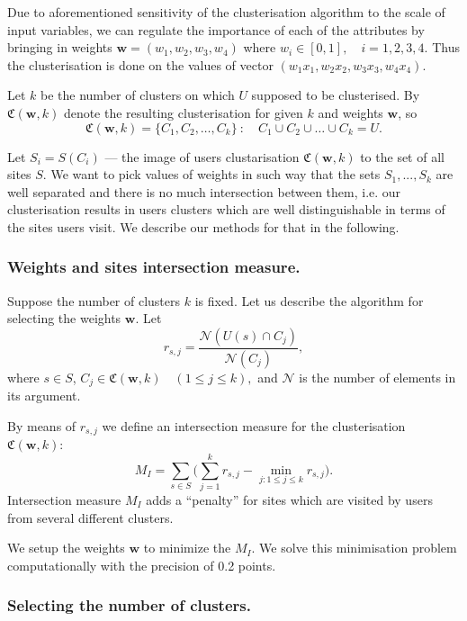 \documentclass[runningheads,a4paper]{llncs}
\begin{document}
Due to aforementioned sensitivity of the clusterisation algorithm to the scale of input variables, we can regulate the importance of each of the attributes by bringing in weights $\boldsymbol{w} = (w_1, w_2, w_3, w_4)$ where \quad $w_i \in [0, 1], \quad i = 1,2,3,4$. Thus the clusterisation is done on the values of vector $(w_1 x_1, w_2 x_2, w_3 x_3, w_4 x_4)$.

Let $k$ be the number of clusters on which $U$ supposed to be clusterised. By $\mathfrak{C}(\boldsymbol{w}, k)$ denote the resulting clusterisation for given $k$ and weights $\boldsymbol{w}$, so
\[
	\mathfrak{C}(\boldsymbol{w}, k) = \{C_1, C_2, \dots, C_k\} \  \colon  \quad  C_1 \cup C_2 \cup \dots \cup C_k = U.
\]

Let $S_i = S(C_i)$ --- the image of users clustarisation $\mathfrak{C}(\boldsymbol{w}, k)$ to the set of all sites $S$. We want to pick values of weights in such way that the sets $S_1, ..., S_k$ are well separated and there is no much intersection between them, i.e. our clusterisation results in users clusters which are well distinguishable in terms of the sites users visit. We describe our methods for that in the following.



\subsubsection{Weights and sites intersection measure.}

Suppose the number of clusters $k$ is fixed. Let us describe the algorithm for selecting the weights $\boldsymbol{w}$. Let
\[
	r_{s,j} = \frac{\mathcal{N}(U(s) \cap C_j)}{\mathcal{N}(C_j)},
\]
where $s \in S$, $C_j \in \mathfrak{C}(\boldsymbol{w}, k) \quad (1 \leq j \leq k ),$ and $\mathcal{N}$ is the number of elements in its argument.

By means of $r_{s,j}$ we define an intersection measure for the clusterisation $\mathfrak{C}(\boldsymbol{w}, k)$:
\[
	M_I = \sum_{s \in S} \Big( \sum_{j=1}^{k} r_{s,j} - \min_{j\colon 1 \leq j \leq k} r_{s,j} \Big).
\]
Intersection measure $M_I$ adds a ``penalty'' for sites which are visited by users from several different clusters.

We setup the weights $\boldsymbol{w}$ to minimize the $M_I$. We solve this minimisation problem computationally with the precision of 0.2 points.



\subsubsection{Selecting the number of clusters.}
\end{document}
